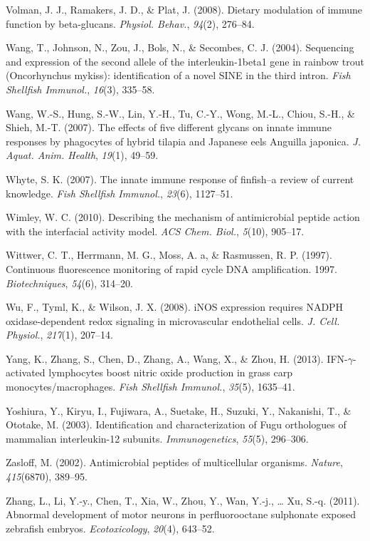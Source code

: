 \documentclass[12pt,a4paper,oneside]{scrbook}
\begin{document}
Volman, J. J., Ramakers, J. D., \& Plat, J. (2008). Dietary modulation
of immune function by beta-glucans. \emph{Physiol. Behav.},
\emph{94}(2), 276--84.

Wang, T., Johnson, N., Zou, J., Bols, N., \& Secombes, C. J. (2004).
Sequencing and expression of the second allele of the interleukin-1beta1
gene in rainbow trout (Oncorhynchus mykiss): identification of a novel
SINE in the third intron. \emph{Fish Shellfish Immunol.}, \emph{16}(3),
335--58.

Wang, W.-S., Hung, S.-W., Lin, Y.-H., Tu, C.-Y., Wong, M.-L., Chiou,
S.-H., \& Shieh, M.-T. (2007). The effects of five different glycans on
innate immune responses by phagocytes of hybrid tilapia and Japanese
eels Anguilla japonica. \emph{J. Aquat. Anim. Health}, \emph{19}(1),
49--59.

Whyte, S. K. (2007). The innate immune response of finfish--a review of
current knowledge. \emph{Fish Shellfish Immunol.}, \emph{23}(6),
1127--51.

Wimley, W. C. (2010). Describing the mechanism of antimicrobial peptide
action with the interfacial activity model. \emph{ACS Chem. Biol.},
\emph{5}(10), 905--17.

Wittwer, C. T., Herrmann, M. G., Moss, A. a, \& Rasmussen, R. P. (1997).
Continuous fluorescence monitoring of rapid cycle DNA amplification.
1997. \emph{Biotechniques}, \emph{54}(6), 314--20.

Wu, F., Tyml, K., \& Wilson, J. X. (2008). iNOS expression requires
NADPH oxidase-dependent redox signaling in microvascular endothelial
cells. \emph{J. Cell. Physiol.}, \emph{217}(1), 207--14.

Yang, K., Zhang, S., Chen, D., Zhang, A., Wang, X., \& Zhou, H. (2013).
IFN-$\gamma$-activated lymphocytes boost nitric oxide production in
grass carp monocytes/macrophages. \emph{Fish Shellfish Immunol.},
\emph{35}(5), 1635--41.

Yoshiura, Y., Kiryu, I., Fujiwara, A., Suetake, H., Suzuki, Y.,
Nakanishi, T., \& Ototake, M. (2003). Identification and
characterization of Fugu orthologues of mammalian interleukin-12
subunits. \emph{Immunogenetics}, \emph{55}(5), 296--306.

Zasloff, M. (2002). Antimicrobial peptides of multicellular organisms.
\emph{Nature}, \emph{415}(6870), 389--95.

Zhang, L., Li, Y.-y., Chen, T., Xia, W., Zhou, Y., Wan, Y.-j., \ldots{}
Xu, S.-q. (2011). Abnormal development of motor neurons in
perfluorooctane sulphonate exposed zebrafish embryos.
\emph{Ecotoxicology}, \emph{20}(4), 643--52.
\end{document}
